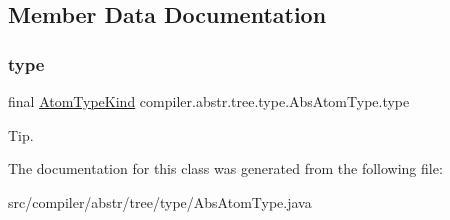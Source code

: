 \subsection{Member Data Documentation}
\mbox{\label{classcompiler_1_1abstr_1_1tree_1_1type_1_1_abs_atom_type_a6a57eb49ff68a7e6be5d3a9ce10480c0}} 
\subsubsection{\texorpdfstring{type}{type}}
{\footnotesize\ttfamily final \hyperlink{enumcompiler_1_1abstr_1_1tree_1_1_atom_type_kind}{Atom\+Type\+Kind} compiler.\+abstr.\+tree.\+type.\+Abs\+Atom\+Type.\+type}

Tip. 

The documentation for this class was generated from the following file\+:\begin{DoxyCompactItemize}
\item 
src/compiler/abstr/tree/type/Abs\+Atom\+Type.\+java\end{DoxyCompactItemize}
